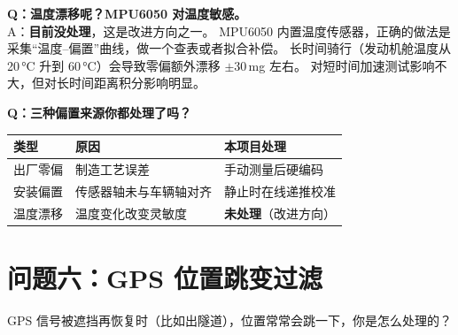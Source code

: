 \documentclass[UTF8,11pt,a4paper]{ctexart}
\begin{document}
\begin{followup}
\textbf{Q：温度漂移呢？MPU6050 对温度敏感。}\\
A：\textbf{目前没处理}，这是改进方向之一。
MPU6050 内置温度传感器，正确的做法是采集``温度--偏置''曲线，做一个查表或者拟合补偿。
长时间骑行（发动机舱温度从 20\,°C 升到 60\,°C）会导致零偏额外漂移 $\pm 30\,$mg 左右。
对短时间加速测试影响不大，但对长时间距离积分影响明显。

\medskip
\textbf{Q：三种偏置来源你都处理了吗？}

\begin{center}\begin{tabular}{lll}
\toprule
类型 & 原因 & 本项目处理 \\\midrule
出厂零偏 & 制造工艺误差 & 手动测量后硬编码 \\
安装偏置 & 传感器轴未与车辆轴对齐 & 静止时在线递推校准 \\
温度漂移 & 温度变化改变灵敏度 & \textbf{未处理}（改进方向） \\
\bottomrule
\end{tabular}\end{center}
\end{followup}

\section{问题六：GPS 位置跳变过滤}

\begin{interviewer}
GPS 信号被遮挡再恢复时（比如出隧道），位置常常会跳一下，你是怎么处理的？
\end{interviewer}
\end{document}
